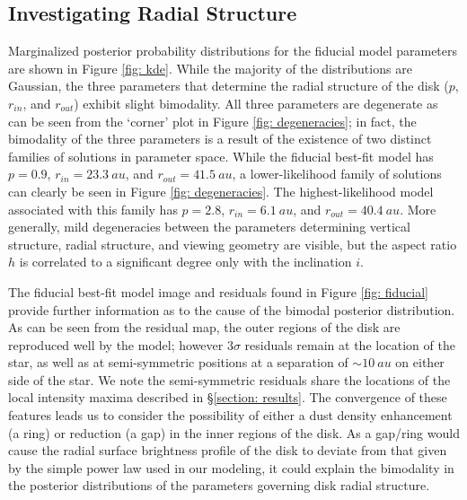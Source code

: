 \documentclass[modern]{aastex62}
\begin{document}
\subsection{Investigating Radial Structure}
\label{subsection: radial analysis}

Marginalized posterior probability distributions for the fiducial model parameters are shown in Figure \ref{fig: kde}.
While the majority of the distributions are Gaussian, the three parameters that determine the radial structure of the disk ($p$, $r_{in}$, and $r_{out}$) exhibit slight bimodality. 
All three parameters are degenerate as can be seen from the `corner' plot in Figure \ref{fig: degeneracies}; in fact, the bimodality of the three parameters is a result of the existence of two distinct families of solutions in parameter space.
While the fiducial best-fit model has $p=0.9$, $r_{in}=\SI{23.3}{au}$, and $r_{out}=\SI{41.5}{au}$, a lower-likelihood family of solutions can clearly be seen in Figure \ref{fig: degeneracies}. The highest-likelihood model associated with this family has $p = 2.8$, $r_{in} = \SI{6.1}{au}$, and $r_{out} = \SI{40.4}{au}$.
More generally, mild degeneracies between the parameters determining vertical structure, radial  structure, and viewing geometry are visible, but the aspect ratio $h$ is correlated to a significant degree only with the inclination $i$.

The fiducial best-fit model image and residuals found in Figure \ref{fig: fiducial} provide further information as to the cause of the bimodal posterior distribution.
As can be seen from the residual map, the outer regions of the disk are reproduced well by the model; however $3\sigma$ residuals remain at the location of the star, as well as at semi-symmetric positions at a separation of $\sim \SI{10}{au}$ on either side of the star. 
We note the semi-symmetric residuals share the locations of the local intensity maxima described in \S \ref{section: results}. 
The convergence of these features leads us to consider the possibility of either a dust density enhancement (a ring) or reduction (a gap) in the inner regions of the disk. 
As a gap/ring would cause the radial surface brightness profile of the disk to deviate from that given by the simple power law used in our modeling, it could explain the bimodality in the posterior distributions of the parameters governing disk radial structure.
\end{document}
